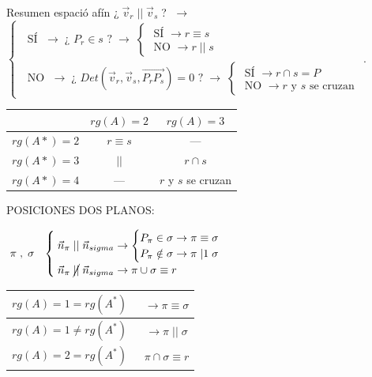 \begin{myalertblock}{Resumen espació afín}
\vspace{2mm} \hspace{-3mm}\footnotesize {¿$\;\vec v_r \; || \; \vec v_s\;$? 
 $\; \to \;$
 $\begin{cases} 
\; \text{ SÍ } \; \to \; \text{¿ } P_r \in s \text{ ?}\; \to \; 
	\begin{cases} 
	\text{ SÍ } \to r\equiv s
	\\ \text{ NO } \to r\;||\;s
	\end{cases}       
\\ \; \text{ NO } \; \to \; \text{¿ } Det(\vec v_r, \vec v_s, \overrightarrow{P_rP_s})=0 \text{ ?}\; \to \; 
	\begin{cases}
	\text{ SÍ } \to r\cap s=P
	\\ \text{ NO } \to r \text{ y } s \text{ se cruzan}
	\end{cases}
\end{cases}$}\normalsize{.}


 	
\begin{table}[H]
\centering
\begin{tabular}{c|c|c|}
\cline{2-3}
                                 & $rg(A)=2$    & $rg(A)=3$                                \\ \hline
\multicolumn{1}{|c|}{$rg(A*)=2$} & $r \equiv s$ & ---                                      \\ \hline
\multicolumn{1}{|c|}{$rg(A*)=3$} & $\;||\;$     & $r \cap s$                               \\ \hline
\multicolumn{1}{|l|}{$rg(A*)=4$} & ---          & \multicolumn{1}{l|}{$r$ y $s$ se cruzan} \\ \hline
\end{tabular}
\end{table}
 
 
 POSICIONES DOS PLANOS:

\vspace{2mm} $\;\pi \;,\; \sigma\:\;\;\begin{cases} 
\; \vec n_{\pi}\;||\; \vec n_{sigma} \to 
	\begin{cases}
	P_{\pi} \in \sigma \to \pi \equiv \sigma 
	\\
	P_{\pi} \notin \sigma \to \pi \;|1\; \sigma 
	\end{cases}
\\
\; \vec n_{\pi}\;\cancel{||}\; \vec n_{sigma} \to \pi \cup \sigma \equiv r
\end{cases}\;$


\begin{table}[H]
\centering
\begin{tabular}{|c|c|}
\hline
$rg(A)=1=rg(A^*)$     & $\;\;\to \pi \equiv \sigma$       \\ \hline
$rg(A)=1\neq rg(A^*)$ & $\;\; \to \pi\;||\;\sigma$        \\ \hline
$rg(A)=2=rg(A^*)$     & $\;\; \pi \cap \sigma \equiv r$ \\ \hline
\end{tabular}
\end{table}




\end{myalertblock}

